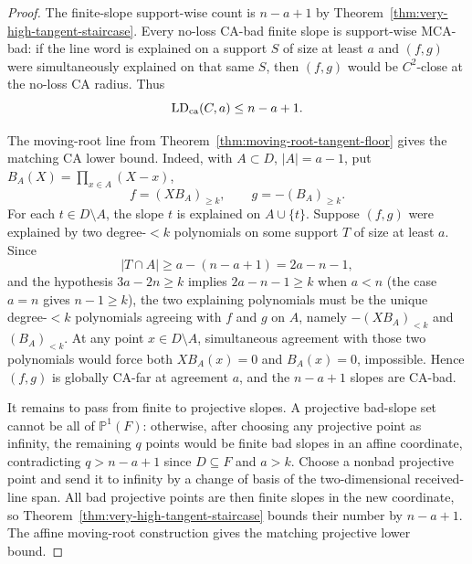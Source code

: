 \begin{proof}
The finite-slope support-wise count is \(n-a+1\) by
Theorem~\ref{thm:very-high-tangent-staircase}.  Every no-loss CA-bad finite
slope is support-wise MCA-bad: if the line word is explained on a support
\(S\) of size at least \(a\) and \((f,g)\) were simultaneously explained on
that same \(S\), then \((f,g)\) would be \(C^2\)-close at the no-loss CA radius.
Thus
\[
  \operatorname{LD}_{\rm ca}(C,a)\le n-a+1 .
\]

The moving-root line from Theorem~\ref{thm:moving-root-tangent-floor} gives the
matching CA lower bound.  Indeed, with \(A\subset D\), \(|A|=a-1\), put
\(B_A(X)=\prod_{x\in A}(X-x)\),
\[
  f=(XB_A)_{\ge k},
  \qquad
  g=-(B_A)_{\ge k}.
\]
For each \(t\in D\setminus A\), the slope \(t\) is explained on
\(A\cup\{t\}\).  Suppose \((f,g)\) were explained by two degree-\(<k\)
polynomials on some support \(T\) of size at least \(a\).  Since
\[
  |T\cap A|\ge a-(n-a+1)=2a-n-1,
\]
and the hypothesis \(3a-2n\ge k\) implies \(2a-n-1\ge k\) when \(a<n\)
(the case \(a=n\) gives \(n-1\ge k\)), the two explaining polynomials must be
the unique degree-\(<k\) polynomials agreeing with \(f\) and \(g\) on \(A\),
namely \(-(XB_A)_{<k}\) and \((B_A)_{<k}\).  At any point
\(x\in D\setminus A\), simultaneous agreement with those two polynomials would
force both \(XB_A(x)=0\) and \(B_A(x)=0\), impossible.  Hence \((f,g)\) is
globally CA-far at agreement \(a\), and the \(n-a+1\) slopes are CA-bad.

It remains to pass from finite to projective slopes.  A projective bad-slope
set cannot be all of \(\mathbb P^1(F)\): otherwise, after choosing any
projective point as infinity, the remaining \(q\) points would be finite bad
slopes in an affine coordinate, contradicting
\(q>n-a+1\) since \(D\subseteq F\) and \(a>k\).  Choose a nonbad projective
point and send it to infinity by a change of basis of the two-dimensional
received-line span.  All bad projective points are then finite slopes in the
new coordinate, so Theorem~\ref{thm:very-high-tangent-staircase} bounds their
number by \(n-a+1\).  The affine moving-root construction gives the matching
projective lower bound.
\end{proof}
